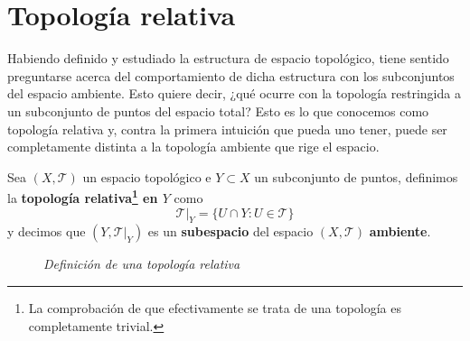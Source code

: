 \section{Topología relativa}%
\label{sec:topologia_relativa}
Habiendo definido y estudiado la estructura de espacio topológico, tiene sentido preguntarse acerca del comportamiento de dicha estructura con los subconjuntos del espacio ambiente. Esto quiere decir, ¿qué ocurre con la topología restringida a un subconjunto de puntos del espacio total? Esto es lo que conocemos como topología relativa y, contra la primera intuición que pueda uno tener, puede ser completamente distinta a la topología ambiente que rige el espacio.

\begin{defi}
Sea $\left( X, \mathcal{T} \right)$ un espacio topológico e $Y \subset X$ un subconjunto de puntos, definimos la \textbf{topología relativa\footnote{La comprobación de que efectivamente se trata de una topología es completamente trivial.} en $Y$} como
$$
\mathcal{T}|_Y = \{U \cap Y: U \in \mathcal{T}\}
$$
y decimos que $\left( Y, \mathcal{T}|_Y \right)$ es un \textbf{subespacio} del espacio $\left( X, \mathcal{T} \right)$ \textbf{ambiente}. 
\end{defi}

\begin{figure}[H]
    \centering
    \caption{\textit{Definición de una topología relativa}}
    \label{fig:definición-topología-relativa}
\end{figure}

